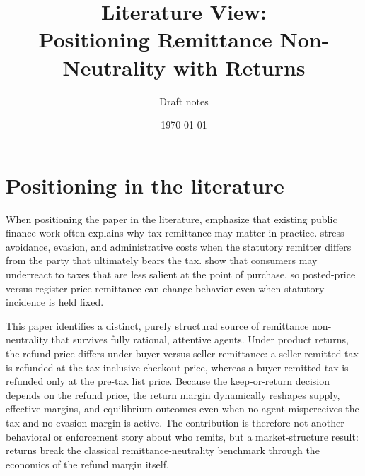 \documentclass[11pt]{article}
\title{Literature View:\\
Positioning Remittance Non-Neutrality with Returns}
\author{Draft notes}
\date{\today}
\begin{document}
\maketitle

\section{Positioning in the literature}

When positioning the paper in the literature, emphasize that existing public
finance work often explains why tax remittance may matter in practice.
\citet{slemrod_does_2008} stress avoidance, evasion, and administrative
costs when the statutory remitter differs from the party that ultimately bears
the tax.  \citet{chetty_salience_2009} show that consumers may underreact to
taxes that are less salient at the point of purchase, so posted-price versus
register-price remittance can change behavior even when statutory incidence is
held fixed.

This paper identifies a distinct, purely structural source of remittance
non-neutrality that survives fully rational, attentive agents.  Under product
returns, the refund price differs under buyer versus seller remittance: a
seller-remitted tax is refunded at the tax-inclusive checkout price, whereas a
buyer-remitted tax is refunded only at the pre-tax list price.  Because the
keep-or-return decision depends on the refund price, the return margin
dynamically reshapes supply, effective margins, and equilibrium outcomes even
when no agent misperceives the tax and no evasion margin is active.  The
contribution is therefore not another behavioral or enforcement story about
who remits, but a market-structure result: returns break the classical
remittance-neutrality benchmark through the economics of the refund margin
itself.
\end{document}
